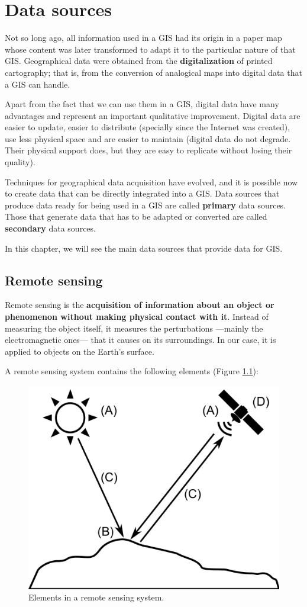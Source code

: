 
\chapter{Data sources}

\pagestyle{fancy}

Not so long ago, all information used in a GIS had its origin in a paper map whose content was later transformed to adapt it to the particular nature of that GIS. Geographical data were obtained from the \textbf{digitalization} of printed cartography; that is, from the conversion of analogical maps into digital data that a GIS can handle.

Apart from the fact that we can use them in a GIS, digital data have many advantages and represent an important qualitative improvement. Digital data are easier to update, easier to distribute (specially since the Internet was created), use less physical space and are easier to maintain (digital data do not degrade. Their physical support does, but they are easy to replicate without losing their quality).

Techniques for geographical data acquisition have evolved, and it is possible now to create data that can be directly integrated into a GIS. Data sources that produce data ready for being used in a GIS are called \textbf{primary} data sources. Those that generate data that has to be adapted or converted are called \textbf{secondary} data sources.

In this chapter, we will see the main data sources that provide data for GIS.

\section{Remote sensing}

Remote sensing is the \textbf{acquisition of information about an object or phenomenon without making physical contact with it}. Instead of measuring the object itself, it measures the perturbations ---mainly the electromagnetic ones--- that it causes on its surroundings. In our case, it is applied to objects on the Earth's surface.

A remote sensing system contains the following elements (Figure \ref{Fig:Elements_remote_sensing}):

\begin{figure}[!hbt]   
\centering
\includegraphics[width=.6\textwidth]{Data_sources/Elements_remote_sensing.pdf}
\caption{\small Elements in a remote sensing system.}
\label{Fig:Elements_remote_sensing} 
\end{figure}


